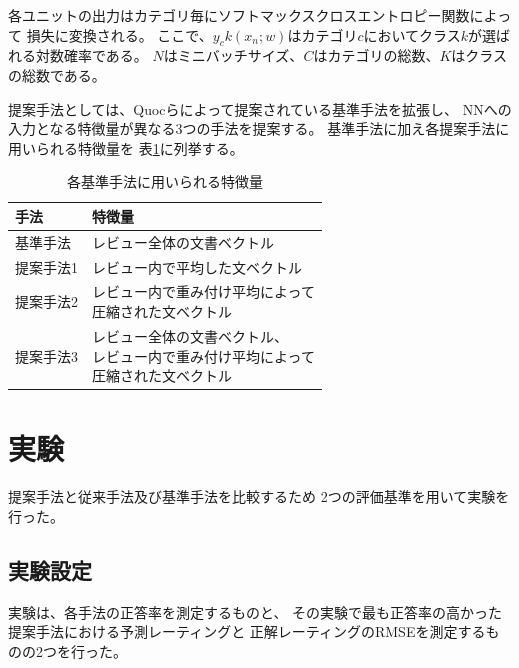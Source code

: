 \documentclass[twocolumn,a4paper]{ltjarticle}
\begin{document}
各ユニットの出力はカテゴリ毎にソフトマックスクロスエントロピー関数によって
損失に変換される。
ここで、$y_ck(x_n; w)$はカテゴリ$c$においてクラス$k$が選ばれる対数確率である。
$N$はミニバッチサイズ、$C$はカテゴリの総数、$K$はクラスの総数である。

提案手法としては、Quocら\cite{quoc14}によって提案されている基準手法を拡張し、
NNへの入力となる特徴量が異なる3つの手法を提案する。
基準手法に加え各提案手法に用いられる特徴量を
表\ref{tab:MethodFeatures}に列挙する。

\begin{table}
  \caption{各基準手法に用いられる特徴量}
  \centering
  \begin{tabular}{l | l} \label{tab:MethodFeatures}
    手法 & 特徴量 \\
    \hline
    基準手法  & レビュー全体の文書ベクトル \\
    提案手法1 & レビュー内で平均した文ベクトル \\
    提案手法2 & \makecell[l]{レビュー内で重み付け平均によって \\
                             圧縮された文ベクトル} \\
    提案手法3 & \makecell[l]{レビュー全体の文書ベクトル、\\
                             レビュー内で重み付け平均によって \\
                             圧縮された文ベクトル} \\
  \end{tabular}
\end{table}



\section{実験}

提案手法と従来手法\cite{fujitani15}及び基準手法を比較するため
2つの評価基準を用いて実験を行った。


\subsection{実験設定}

実験は、各手法の正答率を測定するものと、
その実験で最も正答率の高かった提案手法における予測レーティングと
正解レーティングのRMSEを測定するものの2つを行った。
\end{document}
